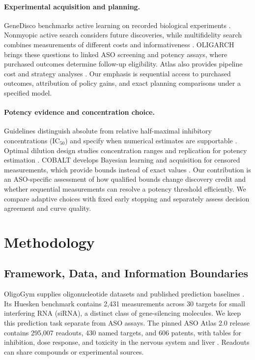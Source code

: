 \documentclass[letterpaper]{article}
\begin{document}
\paragraph{Experimental acquisition and planning.}
GeneDisco benchmarks active learning on recorded biological experiments \citep{genedisco}. Nonmyopic active search considers future discoveries, while multifidelity search combines measurements of different costs and informativeness \citep{jiang,nguyen}. OLIGARCH brings these questions to linked ASO screening and potency assays, where purchased outcomes determine follow-up eligibility. Atlas also provides pipeline cost and strategy analyses \citep{atlas}. Our emphasis is sequential access to purchased outcomes, attribution of policy gains, and exact planning comparisons under a specified model.

\paragraph{Potency evidence and concentration choice.}
Guidelines distinguish absolute from relative half-maximal inhibitory concentrations ($\mathrm{IC}_{50}$) and specify when numerical estimates are supportable \citep{sebaugh}. Optimal dilution design studies concentration ranges and replication for potency estimation \citep{donev}. COBALT develops Bayesian learning and acquisition for censored measurements, which provide bounds instead of exact values \citep{cobalt}. Our contribution is an ASO-specific assessment of how qualified bounds change discovery credit and whether sequential measurements can resolve a potency threshold efficiently. We compare adaptive choices with fixed early stopping and separately assess decision agreement and curve quality.

\section{Methodology}
\subsection{Framework, Data, and Information Boundaries}
OligoGym supplies oligonucleotide datasets and published prediction baselines \citep{oligogym}. Its Huesken benchmark contains 2,431 measurements across 30 targets for small interfering RNA (siRNA), a distinct class of gene-silencing molecules. We keep this prediction task separate from ASO assays. The pinned ASO Atlas 2.0 release contains 295,007 readouts, 430 named targets, and 606 patents, with tables for inhibition, dose response, and toxicity in the nervous system and liver \citep{atlas}. Readouts can share compounds or experimental sources.
\end{document}

